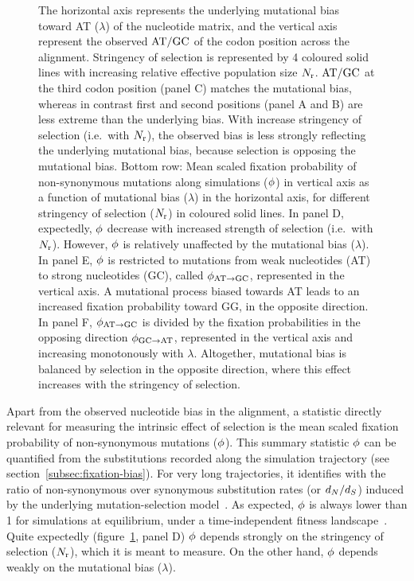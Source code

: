 \documentclass{article}
\begin{document}
\begin{figure}[h]
{ The horizontal axis represents the underlying mutational bias toward AT ($\lambda$) of the nucleotide matrix, and the vertical axis represent the observed $\text{AT/GC}$ of the codon position across the alignment.
 Stringency of selection is represented by 4 coloured solid lines with increasing relative effective population size $N_{\text{r}}$.
 $\text{AT/GC}$ at the third codon position (panel C) matches the mutational bias, whereas in contrast first and second positions (panel A and B) are less extreme than the underlying bias.
 With increase stringency of selection (i.e.~with $N_{\text{r}}$), the observed bias is less strongly reflecting the underlying mutational bias, because selection is opposing the mutational bias.
 Bottom row: Mean scaled fixation probability of non-synonymous mutations along simulations ($\phi$) in vertical axis as a function of mutational bias ($\lambda$) in the horizontal axis, for different stringency of selection ($N_{\text{r}}$) in coloured solid lines.
 In panel D, expectedly, $\phi$ decrease with increased strength of selection (i.e.~with $N_{\text{r}}$).
 However, $\phi$ is relatively unaffected by the mutational bias ($\lambda$).
 In panel E, $\phi$ is restricted to mutations from weak nucleotides (AT) to strong nucleotides (GC), called $\phi_{\text{AT} \rightarrow \text{GC}}$, represented in the vertical axis.
 A mutational process biased towards AT leads to an increased fixation probability toward GG, in the opposite direction.
 In panel F, $\phi_{\text{AT} \rightarrow \text{GC}}$ is divided by the fixation probabilities in the opposing direction $\phi_{\text{GC} \rightarrow \text{AT}}$, represented in the vertical axis and increasing monotonously with $\lambda$.
 Altogether, mutational bias is balanced by selection in the opposite direction, where this effect increases with the stringency of selection.
 }
 \label{fig:simu-mut-bias}
\end{figure}

Apart from the observed nucleotide bias in the alignment, a statistic directly relevant for measuring the intrinsic effect of selection is the mean scaled fixation probability of {non-synonymous} mutations ($\phi$).
This summary statistic $\phi$ can be quantified from the {substitutions} recorded along the simulation trajectory (see section~\ref{subsec:fixation-bias}).
For very long trajectories, it identifies with the ratio of {non-synonymous} over {synonymous} {substitution} rates (or $d_N / d_S$) induced by the underlying mutation-selection model~\citep{Spielman2015, DosReis2015, Jones2016}.
As expected, $\phi$ is always lower than 1 for simulations at equilibrium, under a time-independent fitness landscape~\citep{Spielman2015}.
Quite expectedly (figure~\ref{fig:simu-mut-bias}, panel D) $\phi$ depends strongly on the stringency of selection ($N_{\text{r}}$), which it is meant to measure.
On the other hand, $\phi$ depends weakly on the mutational bias ($\lambda$).
\end{document}
